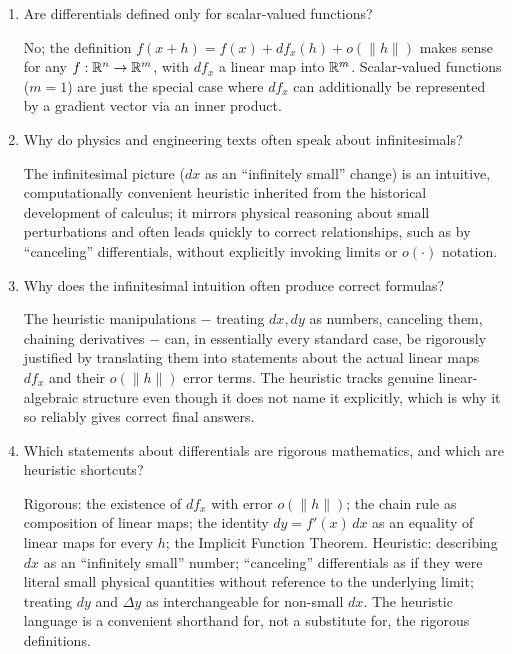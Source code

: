 \documentclass{self-check}
\begin{document}
\begin{enumerate}[resume, leftmargin=*, itemsep=8pt]
\item Are differentials defined only for scalar-valued functions?
\begin{answer}
No; the definition \(f(x+h)=f(x)+df_x(h)+o(\|h\|)\) makes sense for any \(f:\mathbb{R}^n\to\mathbb{R}^m\), with \(df_x\) a linear map into \(\mathbb{R}^m\). Scalar-valued functions (\(m=1\)) are just the special case where \(df_x\) can additionally be represented by a gradient vector via an inner product.
\end{answer}

\item Why do physics and engineering texts often speak about infinitesimals?
\begin{answer}
The infinitesimal picture (\(dx\) as an ``infinitely small'' change) is an intuitive, computationally convenient heuristic inherited from the historical development of calculus; it mirrors physical reasoning about small perturbations and often leads quickly to correct relationships, such as by ``canceling'' differentials, without explicitly invoking limits or \(o(\cdot)\) notation.
\end{answer}

\item Why does the infinitesimal intuition often produce correct formulas?
\begin{answer}
The heuristic manipulations \(-\) treating \(dx,dy\) as numbers, canceling them, chaining derivatives \(-\) can, in essentially every standard case, be rigorously justified by translating them into statements about the actual linear maps \(df_x\) and their \(o(\|h\|)\) error terms. The heuristic tracks genuine linear-algebraic structure even though it does not name it explicitly, which is why it so reliably gives correct final answers.
\end{answer}

\item Which statements about differentials are rigorous mathematics, and which are heuristic shortcuts?
\begin{answer}
Rigorous: the existence of \(df_x\) with error \(o(\|h\|)\); the chain rule as composition of linear maps; the identity \(dy=f'(x)\,dx\) as an equality of linear maps for every \(h\); the Implicit Function Theorem. Heuristic: describing \(dx\) as an ``infinitely small'' number; ``canceling'' differentials as if they were literal small physical quantities without reference to the underlying limit; treating \(dy\) and \(\Delta y\) as interchangeable for non-small \(dx\). The heuristic language is a convenient shorthand for, not a substitute for, the rigorous definitions.
\end{answer}

\end{enumerate}
\end{document}
